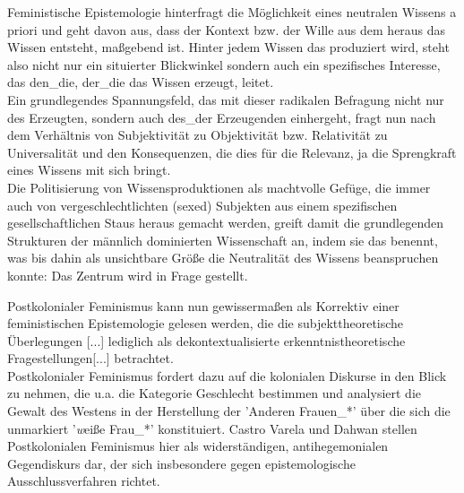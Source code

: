 Feministische Epistemologie hinterfragt die Möglichkeit eines neutralen Wissens
a priori und geht davon aus, dass der Kontext bzw. der Wille aus dem heraus das
Wissen entsteht, maßgebend ist. Hinter jedem Wissen das produziert wird, steht
also nicht nur ein situierter Blickwinkel sondern auch ein spezifisches
Interesse, das den\_die, der\_die das Wissen erzeugt, leitet.\\
 Ein grundlegendes
Spannungsfeld, das mit dieser radikalen Befragung nicht nur des Erzeugten,
sondern auch des\_der Erzeugenden einhergeht, fragt nun nach dem Verhältnis von
Subjektivität zu Objektivität bzw. Relativität zu Universalität und den
Konsequenzen, die dies für die Relevanz, ja die Sprengkraft eines Wissens mit
sich bringt.\footnotemark {} \\
Die Politisierung von Wissensproduktionen als machtvolle Gefüge,
die immer auch von vergeschlechtlichten (sexed) Subjekten aus einem
spezifischen gesellschaftlichen Staus heraus gemacht werden, greift damit die
grundlegenden Strukturen der männlich dominierten Wissenschaft an, indem sie
das benennt, was bis dahin als unsichtbare Größe die Neutralität des Wissens
beanspruchen konnte: Das Zentrum wird in Frage gestellt.\footnotemark
{}

Postkolonialer Feminismus kann nun gewissermaßen als Korrektiv einer
feministischen Epistemologie gelesen werden, die die \glqq subjekttheoretische
Überlegungen [...] lediglich als dekontextualisierte erkenntnistheoretische
Fragestellungen[...] \grqq \footnotemark {} betrachtet. \\
Postkolonialer Feminismus fordert dazu auf die kolonialen
Diskurse in den Blick zu nehmen, die u.a. die Kategorie Geschlecht bestimmen
und \glqq analysiert die Gewalt des Westens \grqq \footnotemark
{} in der Herstellung der 'Anderen
Frauen\_*' über die sich die unmarkiert '\textit{w}eiße Frau\_*' konstituiert.
Castro Varela und Dahwan stellen Postkolonialen Feminismus hier als
\glqq widerständigen, antihegemonialen Gegendiskurs dar, der sich insbesondere gegen
epistemologische Ausschlussverfahren richtet.\grqq \footnotemark
{}

